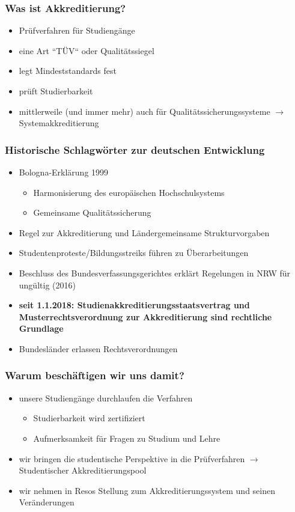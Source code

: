 \documentclass[german,10pt,xcolor=colortbl,compress]{beamer}
\begin{document}
\frame{\tableofcontents[currentsection]}
\begin{frame}
  \frametitle{Was ist Akkreditierung?}
  \begin{itemize}
  	\item Prüfverfahren für Studiengänge
  	\item eine Art ``TÜV`` oder Qualitätssiegel
  	\item legt Mindeststandards fest
  	\item prüft Studierbarkeit
  	\vspace{1cm}
  	\item mittlerweile (und immer mehr) auch für Qualitätssicherungssysteme $\rightarrow$ Systemakkreditierung
  \end{itemize}   
\end{frame}
\begin{frame} 
  \frametitle{Historische Schlagwörter zur deutschen Entwicklung} 
  \begin{itemize}
  	\item Bologna-Erklärung 1999
  		\begin{itemize}
  			\item Harmonisierung des europäischen Hochschulsystems
  			\item Gemeinsame Qualitätssicherung
  		\end{itemize}
  	\pause
  	\item Regel zur Akkreditierung und Ländergemeinsame Strukturvorgaben
  	\item Studentenproteste/Bildungsstreiks führen zu Überarbeitungen
  	\item Beschluss des Bundesverfassungsgerichtes erklärt Regelungen in NRW für ungültig (2016)
  	\vspace{1cm}
  	\pause
  	\item \textbf{seit 1.1.2018: Studienakkreditierungsstaatsvertrag und Musterrechtsverordnung zur Akkreditierung sind rechtliche Grundlage}
  	\item Bundesländer erlassen Rechtsverordnungen
  \end{itemize}   
\end{frame}
\begin{frame} 
  \frametitle{Warum beschäftigen wir uns damit?} 
  \begin{itemize}
  	\item unsere Studiengänge durchlaufen die Verfahren
  		\begin{itemize}
  			\item Studierbarkeit wird zertifiziert
  			\item Aufmerksamkeit für Fragen zu Studium und Lehre
  		\end{itemize}
  	\pause
  	\item wir bringen die studentische Perspektive in die Prüfverfahren $\rightarrow$ Studentischer Akkreditierungspool
  	\pause
  	\item wir nehmen in Resos Stellung zum Akkreditierungssystem und seinen Veränderungen
  \end{itemize}   
\end{frame}
\end{document}
